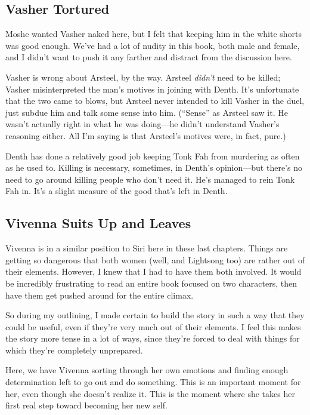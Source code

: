 \subsection*{Vasher Tortured}

Moshe wanted Vasher naked here, but I felt that keeping him in the white shorts was good enough. We’ve had a lot of nudity in this book, both male and female, and I didn’t want to push it any farther and distract from the discussion here.

Vasher is wrong about Arsteel, by the way. Arsteel \textit{didn’t} need to be killed; Vasher misinterpreted the man’s motives in joining with Denth. It’s unfortunate that the two came to blows, but Arsteel never intended to kill Vasher in the duel, just subdue him and talk some sense into him. (“Sense” as Arsteel saw it. He wasn’t actually right in what he was doing—he didn’t understand Vasher’s reasoning either. All I’m saying is that Arsteel’s motives were, in fact, pure.)

Denth has done a relatively good job keeping Tonk Fah from murdering as often as he used to. Killing is necessary, sometimes, in Denth’s opinion—but there’s no need to go around killing people who don’t need it. He’s managed to rein Tonk Fah in. It’s a slight measure of the good that’s left in Denth.

\subsection*{Vivenna Suits Up and Leaves}

Vivenna is in a similar position to Siri here in these last chapters. Things are getting so dangerous that both women (well, and Lightsong too) are rather out of their elements. However, I knew that I had to have them both involved. It would be incredibly frustrating to read an entire book focused on two characters, then have them get pushed around for the entire climax.

So during my outlining, I made certain to build the story in such a way that they could be useful, even if they’re very much out of their elements. I feel this makes the story more tense in a lot of ways, since they’re forced to deal with things for which they’re completely unprepared.

Here, we have Vivenna sorting through her own emotions and finding enough determination left to go out and do something. This is an important moment for her, even though she doesn’t realize it. This is the moment where she takes her first real step toward becoming her new self.

